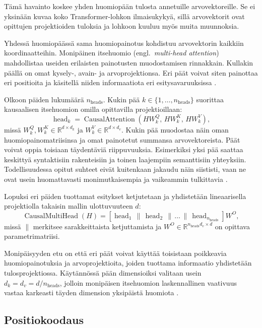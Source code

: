 Tämä havainto koskee yhden huomiopään tulosta annetuille
arvovektoreille. Se ei yksinään kuvaa koko Transformer-lohkon
ilmaisukykyä, sillä arvovektorit ovat opittujen projektioiden
tuloksia ja lohkoon kuuluu myös muita muunnoksia.

Yhdessä huomiopäässä sama huomiopainotus kohdistuu arvovektorin
kaikkiin koordinaatteihin. Monipäinen itsehuomio
(engl.\ \emph{multi-head attention}) mahdollistaa useiden
erilaisten painotusten muodostamisen rinnakkain. Kullakin
päällä on omat kysely-, avain- ja arvoprojektionsa.
Eri päät voivat siten painottaa eri positioita ja käsitellä
niiden informaatiota eri esitysavaruuksissa
\cite{vaswani2017attention}.

Olkoon päiden lukumäärä \(n_\text{heads}\). Kukin pää
\(k \in \{1,\dots,n_\text{heads}\}\) suorittaa kausaalisen itsehuomion
omilla opittavilla projektioillaan:
$$
\operatorname{head}_k
=
\operatorname{CausalAttention}
\left(
  H W_k^Q,\,
  H W_k^K,\,
  H W_k^V
\right),
$$
missä \(W_k^Q, W_k^K \in \mathbb{R}^{d \times d_k}\) ja
\(W_k^V \in \mathbb{R}^{d \times d_v}\). Kukin pää muodostaa näin oman huomiopainomatriisinsa ja omat painotetut summansa arvovektoreista. Päät voivat oppia toisiaan täydentäviä riippuvuuksia. Esimerkiksi yksi pää saattaa keskittyä syntaktisiin rakenteisiin ja toinen laajempiin semanttisiin yhteyksiin. Todellisuudessa opitut suhteet eivät kuitenkaan jakaudu näin siististi, vaan ne ovat usein huomattavasti monimutkaisempia ja vaikeammin tulkittavia \cite{clark2019what}.

Lopuksi eri päiden tuottamat esitykset ketjutetaan ja
yhdistetään lineaarisella projektiolla takaisin mallin
ulottuvuuteen \(d\):
$$
\operatorname{CausalMultiHead}(H)
=
\left[
  \operatorname{head}_1
  \,\|\,
  \operatorname{head}_2
  \,\|\,
  \dots
  \,\|\,
  \operatorname{head}_{n_\text{heads}}
\right] W^O,
$$
missä \(\|\) merkitsee sarakkeittaista ketjuttamista ja
\(W^O \in \mathbb{R}^{n_\text{heads} d_v \times d}\) on opittava
parametrimatriisi.

Monipäisyyden etu on että eri päät
voivat käyttää toisistaan poikkeavia huomiopainotuksia ja
arvoprojektioita, joiden tuottama informaatio yhdistetään
tulosprojektiossa. Käytännössä pään dimensioiksi valitaan
usein \(d_k = d_v = d/n_\text{heads}\), jolloin monipäisen itsehuomion
laskennallinen vaativuus vastaa karkeasti täyden dimension
yksipäistä huomiota \cite{vaswani2017attention}.

\subsection{Positiokoodaus}

